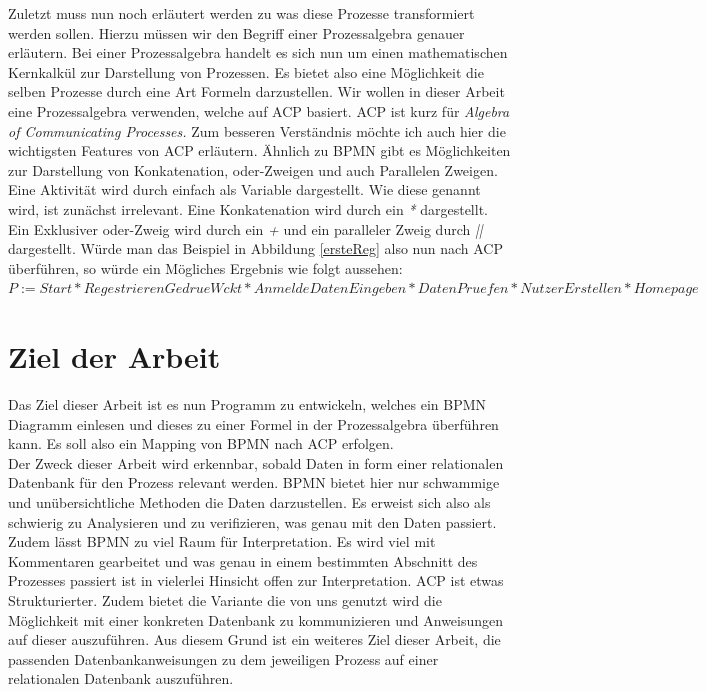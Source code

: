 Zuletzt muss nun noch erläutert werden zu was diese Prozesse transformiert werden sollen. Hierzu müssen wir den Begriff einer Prozessalgebra genauer erläutern. Bei einer Prozessalgebra handelt es sich nun um einen mathematischen Kernkalkül zur Darstellung von Prozessen. Es bietet also eine Möglichkeit die selben Prozesse durch eine Art Formeln darzustellen. Wir wollen in dieser Arbeit eine Prozessalgebra verwenden, welche auf ACP basiert. ACP ist kurz für \textit{Algebra of Communicating Processes.} Zum besseren Verständnis möchte ich auch hier die wichtigsten Features von ACP erläutern. Ähnlich zu BPMN gibt es Möglichkeiten zur Darstellung von Konkatenation, oder-Zweigen und auch Parallelen Zweigen. Eine Aktivität wird durch einfach als Variable dargestellt. Wie diese genannt wird, ist zunächst irrelevant. Eine Konkatenation wird durch ein \textit{*} dargestellt. Ein Exklusiver oder-Zweig wird durch ein \textit{+} und ein paralleler Zweig durch \textit{||} dargestellt. Würde man das Beispiel in Abbildung  \ref{ersteReg} also nun nach ACP überführen, so würde ein Mögliches Ergebnis wie folgt aussehen:\\
$P:=Start*RegestrierenGedrueWckt*AnmeldeDatenEingeben*DatenPruefen*NutzerErstellen*Homepage $

\section {Ziel der Arbeit}\label {Ziel der Arbeit}
Das Ziel dieser Arbeit ist es nun Programm zu entwickeln, welches ein BPMN Diagramm einlesen und dieses zu einer Formel in der Prozessalgebra überführen kann. Es soll also ein Mapping von BPMN nach ACP erfolgen.\\
Der Zweck dieser Arbeit wird erkennbar, sobald Daten in form einer relationalen Datenbank für den Prozess relevant werden. BPMN bietet hier nur schwammige und unübersichtliche Methoden die Daten darzustellen. Es erweist sich also als schwierig zu Analysieren und zu verifizieren, was genau mit den Daten passiert. Zudem lässt BPMN zu viel Raum für Interpretation. Es wird viel mit Kommentaren gearbeitet und was genau in einem bestimmten Abschnitt des Prozesses passiert ist in vielerlei Hinsicht offen zur Interpretation. ACP ist etwas Strukturierter. Zudem bietet die Variante die von uns genutzt wird die Möglichkeit mit einer konkreten Datenbank zu kommunizieren und Anweisungen auf dieser auszuführen. Aus diesem Grund ist ein weiteres Ziel dieser Arbeit, die passenden Datenbankanweisungen zu dem jeweiligen Prozess auf einer relationalen Datenbank auszuführen.




